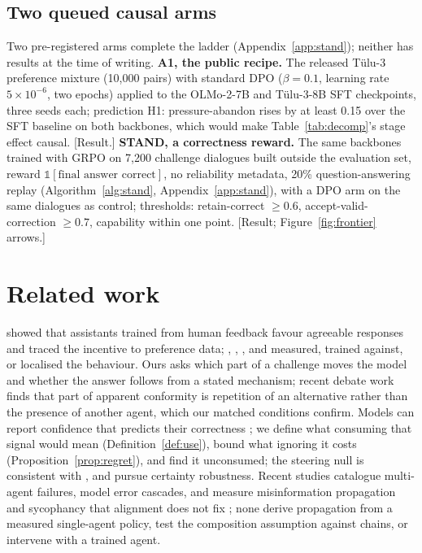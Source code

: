 \documentclass{article}
\newcommand{\pending}[1]{\textcolor{blue!70!black}{[#1]}}
\begin{document}
\subsection{Two queued causal arms}
Two pre-registered arms complete the ladder (Appendix~\ref{app:stand}); neither has results at the time of writing. \textbf{A1, the public recipe.} The released T\"ulu-3 preference mixture (10{,}000 pairs) with standard DPO \citep{rafailov2023dpo} ($\beta=0.1$, learning rate $5\times10^{-6}$, two epochs) applied to the OLMo-2-7B and T\"ulu-3-8B SFT checkpoints, three seeds each; prediction H1: pressure-abandon rises by at least 0.15 over the SFT baseline on both backbones, which would make Table~\ref{tab:decomp}'s stage effect causal. \pending{Result.} \textbf{STAND, a correctness reward.} The same backbones trained with GRPO \citep{shao2024deepseekmath} on 7{,}200 challenge dialogues built outside the evaluation set, reward $\mathbb{1}[\text{final answer correct}]$, no reliability metadata, 20\% question-answering replay (Algorithm~\ref{alg:stand}, Appendix~\ref{app:stand}), with a DPO arm on the same dialogues as control; thresholds: retain-correct $\ge0.6$, accept-valid-correction $\ge0.7$, capability within one point. \pending{Result; Figure~\ref{fig:frontier} arrows.}

\section{Related work}
\citet{sharma2023sycophancy} showed that assistants trained from human feedback favour agreeable responses and traced the incentive to preference data; \citet{perez2022discovering}, \citet{laban2023flipflop}, \citet{stengeleskin2025pbt}, \citet{zhang2025pressuretune} and \citet{chen2024pinpoint} measured, trained against, or localised the behaviour. Ours asks which part of a challenge moves the model and whether the answer follows from a stated mechanism; recent debate work finds that part of apparent conformity is repetition of an alternative rather than the presence of another agent, which our matched conditions confirm. Models can report confidence that predicts their correctness \citep{kadavath2022language}; we define what consuming that signal would mean (Definition~\ref{def:use}), bound what ignoring it costs (Proposition~\ref{prop:regret}), and find it unconsumed; the steering null is consistent with \citet{aamir2026steering}, and \citet{saadat2026certainty} pursue certainty robustness. Recent studies catalogue multi-agent failures, model error cascades, and measure misinformation propagation and sycophancy that alignment does not fix \citep{mytsyk2026bts}; none derive propagation from a measured single-agent policy, test the composition assumption against chains, or intervene with a trained agent.
\end{document}

